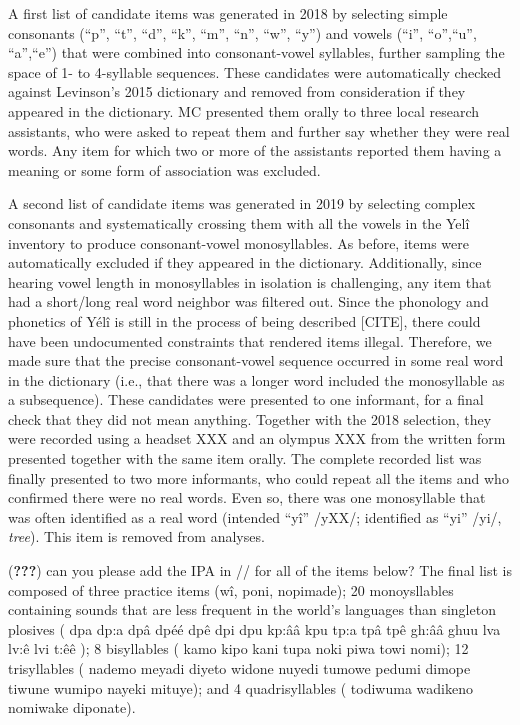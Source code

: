 \documentclass[english,,man,floatsintext]{apa6}
\begin{document}
A first list of candidate items was generated in 2018 by selecting simple consonants (\enquote{p}, \enquote{t}, \enquote{d}, \enquote{k}, \enquote{m}, \enquote{n}, \enquote{w}, \enquote{y}) and vowels (\enquote{i}, \enquote{o},\enquote{u}, \enquote{a},\enquote{e}) that were combined into consonant-vowel syllables, further sampling the space of 1- to 4-syllable sequences. These candidates were automatically checked against Levinson's 2015 dictionary and removed from consideration if they appeared in the dictionary. MC presented them orally to three local research assistants, who were asked to repeat them and further say whether they were real words. Any item for which two or more of the assistants reported them having a meaning or some form of association was excluded.

A second list of candidate items was generated in 2019 by selecting complex consonants and systematically crossing them with all the vowels in the Yelî inventory to produce consonant-vowel monosyllables. As before, items were automatically excluded if they appeared in the dictionary. Additionally, since hearing vowel length in monosyllables in isolation is challenging, any item that had a short/long real word neighbor was filtered out. Since the phonology and phonetics of Yélî is still in the process of being described {[}CITE{]}, there could have been undocumented constraints that rendered items illegal. Therefore, we made sure that the precise consonant-vowel sequence occurred in some real word in the dictionary (i.e., that there was a longer word included the monosyllable as a subsequence). These candidates were presented to one informant, for a final check that they did not mean anything. Together with the 2018 selection, they were recorded using a headset XXX and an olympus XXX from the written form presented together with the same item orally. The complete recorded list was finally presented to two more informants, who could repeat all the items and who confirmed there were no real words. Even so, there was one monosyllable that was often identified as a real word (intended \enquote{yî} /yXX/; identified as \enquote{yi} /yi/, \emph{tree}). This item is removed from analyses.

({\textbf{???}}) can you please add the IPA in // for all of the items below?
The final list is composed of three practice items (wî, poni, nopimade); 20 monoysllables containing sounds that are less frequent in the world's languages than singleton plosives (
dpa
dp:a
dpâ
dpéé
dpê
dpi
dpu
kp:ââ
kpu
tp:a
tpâ
tpê
gh:ââ
ghuu
lva
lv:ê
lvi
t:êê
); 8 bisyllables (
kamo
kipo
kani
tupa
noki
piwa
towi
nomi);
12 trisyllables (
nademo
meyadi
diyeto
widone
nuyedi
tumowe
pedumi
dimope
tiwune
wumipo
nayeki
mituye); and 4 quadrisyllables (
todiwuma
wadikeno
nomiwake
diponate).
\end{document}
